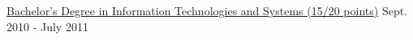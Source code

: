 \begin{cventries}
  \cventry
    {\href{https://www.ubi.pt/en/course/64}{Bachelor's Degree in Information Technologies and Systems (15/20 points)}} %
    {} %
    {} %
    {Sept. 2010 - July 2011} %
    {
    }
  \vspace{-0.5cm}
  

\end{cventries}
